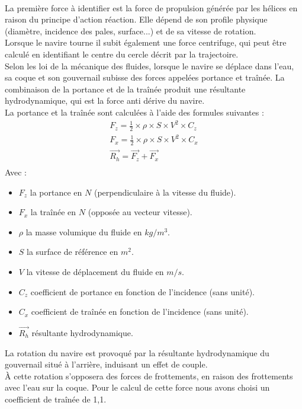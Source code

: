 \documentclass[a4paper,11pt]{article}
\begin{document}
    \paragraph{}
    La première force à identifier est la force de propulsion générée par les hélices en raison du principe d'action réaction. Elle dépend de son profile physique  (diamètre, incidence des pales, surface...) et de sa vitesse de rotation.\\
    Lorsque le navire tourne il subit également une force centrifuge, qui peut être calculé en identifiant le centre du cercle décrit par la trajectoire.\\
    Selon les loi de la mécanique des fluides, lorsque le navire se déplace dans l'eau, sa coque et son gouvernail subisse des forces appelées portance et traînée.
    La combinaison de la portance et de la traînée produit une résultante hydrodynamique, qui est la force anti dérive du navire.\\
    La portance et la traînée sont calculées à l'aide des formules suivantes :\\
    \begin{gather*}
        F_{z} = \frac{1}{2} \times \rho \times S \times V^{2} \times C_{z}\\
        F_{x} = \frac{1}{2} \times \rho \times S \times V^{2} \times C_{x}\\
        \overrightarrow{R_{h}} = \overrightarrow{F_{z}} + \overrightarrow{F_{x}}\\
    \end{gather*}
    Avec :
    \begin{itemize}
        \item $F_{z}$ la portance en $N$ (perpendiculaire à la vitesse du fluide).
        \item $F_{x}$ la traînée en $N$ (opposée au vecteur vitesse).
        \item $\rho$ la masse volumique du fluide en $kg/m^{3}$.
        \item $S$ la surface de référence en $m^{2}$.
        \item $V$ la vitesse de déplacement du fluide en $m/s$.
        \item $C_{z}$ coefficient de portance en fonction de l'incidence (sans unité).
        \item $C_{x}$ coefficient de traînée en fonction de l'incidence (sans unité).
        \item $\overrightarrow{R_{h}}$ résultante hydrodynamique.
    \end{itemize}
    \vspace*{0.3cm}
    La rotation du navire est provoqué par la résultante hydrodynamique du gouvernail situé à l’arrière, induisant un effet de couple.\\
    À cette rotation s’opposera des forces de frottements, en raison des frottements avec l'eau sur la coque. Pour le calcul de cette force nous avons choisi un coefficient de traînée de 1,1.
\end{document}

